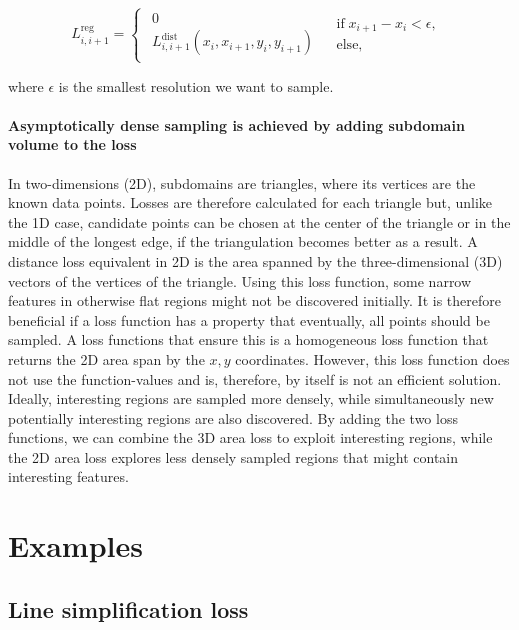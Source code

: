 \documentclass[english, twocolumn, 10pt, aps, superscriptaddress, floatfix, prb, citeautoscript]{revtex4-1}
\begin{document}
\begin{equation*}
L_{i,i+1}^\textrm{reg}=\begin{cases}
\begin{array}{c}
0\\
L_{i, i+1}^\textrm{dist}(x_i, x_{i+1}, y_i, y_{i+1})
\end{array} & \begin{array}{c}
\textrm{if} \; x_{i+1}-x_{i}<\epsilon,\\
\textrm{else,}
\end{array}\end{cases}
\end{equation*}

where \(\epsilon\) is the smallest resolution we want to sample.

\paragraph{Asymptotically dense sampling is achieved by adding subdomain volume to the loss}

In two-dimensions (2D), subdomains are triangles, where its vertices are the known data points.
Losses are therefore calculated for each triangle but, unlike the 1D case, candidate points can be chosen at the center of the triangle or in the middle of the longest edge, if the triangulation becomes better as a result.
A distance loss equivalent in 2D is the area spanned by the three-dimensional (3D) vectors of the vertices of the triangle.
Using this loss function, some narrow features in otherwise flat regions might not be discovered initially.
It is therefore beneficial if a loss function has a property that eventually, all points should be sampled.
A loss functions that ensure this is a homogeneous loss function that returns the 2D area span by the \(x, y\) coordinates.
However, this loss function does not use the function-values and is, therefore, by itself is not an efficient solution.
Ideally, interesting regions are sampled more densely, while simultaneously new potentially interesting regions are also discovered.
By adding the two loss functions, we can combine the 3D area loss to exploit interesting regions, while the 2D area loss explores less densely sampled regions that might contain interesting features.

\section{Examples}

\subsection{Line simplification loss}
\end{document}
